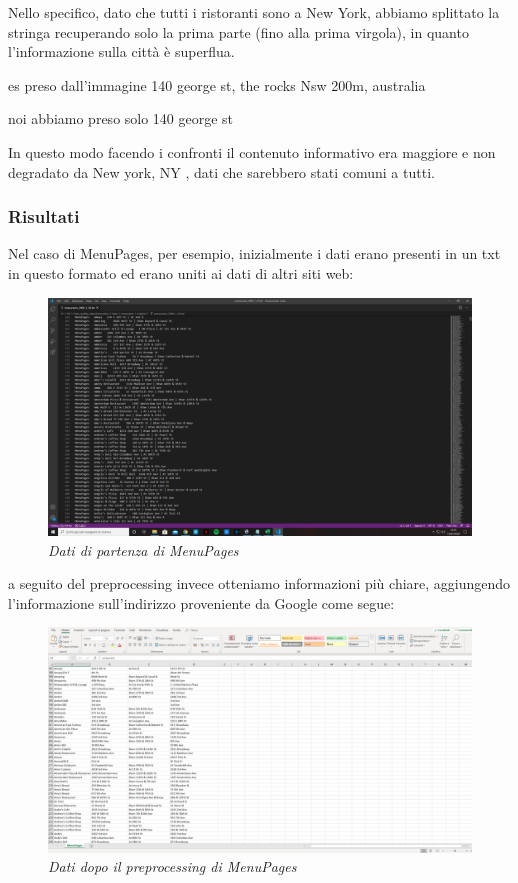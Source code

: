 \documentclass[a4paper,12pt]{article}
\begin{document}
Nello specifico,  dato che tutti i ristoranti sono a New York, abbiamo splittato la stringa recuperando solo la prima parte (fino alla prima virgola), in quanto l'informazione sulla città è superflua. 
 
es preso dall'immagine
140 george st, the rocks Nsw 200m, australia

noi abbiamo preso solo 140 george st

In questo modo facendo i confronti il contenuto informativo era maggiore e non degradato da New york, NY , dati che sarebbero stati comuni a tutti.

\subsubsection{Risultati}
Nel caso di MenuPages, per esempio, inizialmente i dati erano presenti in un txt in questo formato ed erano uniti ai dati di altri siti web:\\
\begin{figure}[H]
\centering
\includegraphics[width=0.9\linewidth]{img/original.png}
\caption{\textit{Dati di partenza di MenuPages}}
\end{figure}

a seguito del preprocessing invece otteniamo informazioni più chiare, aggiungendo l'informazione sull'indirizzo proveniente da Google come segue:\\

\begin{figure}[H]
\centering
\includegraphics[width=0.9\linewidth]{img/new.png}
\caption{\textit{Dati dopo il preprocessing di MenuPages}}
\end{figure}
\end{document}
